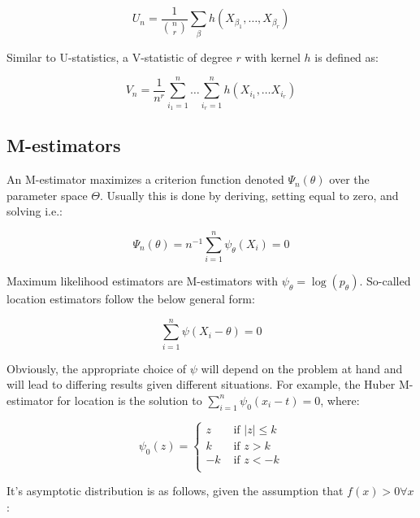 \documentclass{report}
\begin{document}
\begin{equation}\label{eq:lst-u-statistic}
    U_n = \frac{1}{\binom{n}{r}} \sum_\beta h(X_{\beta_1}, \dots, X_{\beta_r})
\end{equation}

Similar to U-statistics, a V-statistic of degree $r$ with kernel $h$ is defined as:

\begin{equation}\label{eq:lst-v-statistic}
    V_n = \frac{1}{n^r} \sum_{i_1=1}^n \dots \sum_{i_r=1}^n h(X_{i_1}, \dots X_{i_r})  
\end{equation}

\subsection{M-estimators}

An M-estimator maximizes a criterion function denoted $\Psi_n(\theta)$ over the parameter space $\Theta$. Usually this is done by deriving, setting equal to zero, and solving i.e.:

\begin{equation}\label{eq:lst-m-estimator}
    \Psi_n(\theta) = n^{-1} \sum_{i=1}^n \psi_\theta (X_i) = 0
\end{equation}

Maximum likelihood estimators are M-estimators with $\psi_\theta = \log(p_\theta)$. So-called location estimators follow the below general form:

\begin{equation}\label{eq:lst-location-m-estimator}
    \sum_{i=1}^n \psi(X_i - \theta) = 0
\end{equation}

Obviously, the appropriate choice of $\psi$ will depend on the problem at hand and will lead to differing results given different situations. For example, the Huber M-estimator for location is the solution to $\sum_{i=1}^n \psi_0(x_i - t) = 0$, where:

\begin{equation}\label{eq:huber-m-estimator}
    \psi_0(z) = \begin{cases}
        z &\text{ if } |z| \le k  \\
        k &\text{ if } z > k \\
        -k &\text{ if } z < -k \\
    \end{cases}
\end{equation}

It's asymptotic distribution is as follows, given the assumption that $f(x) > 0 \forall x$:
\end{document}
